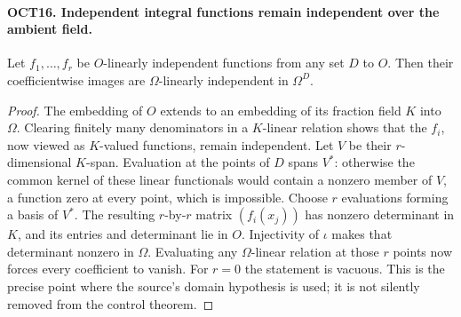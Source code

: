 \documentclass[11pt,a4paper]{article}
\numberwithin{equation}{section}
\theoremstyle{remark}\newtheorem{remark}[theorem]{Remark}
\begin{document}
\paragraph{OCT16. Independent integral functions remain independent over the ambient field.}
\label{claim:OCT16}
Let $f_1,\ldots,\allowbreak{} f_r$ be $O$-linearly independent functions
from any set $D$ to $O$.  Then their coefficientwise images
are $\Omega$-linearly independent in $\Omega^D$.
\begin{proof}
The embedding of $O$ extends to an embedding of its fraction
field $K$ into $\Omega$.  Clearing finitely many denominators
in a $K$-linear relation shows that the $f_i$, now viewed as
$K$-valued functions, remain independent.  Let $V$ be their
$r$-dimensional $K$-span.  Evaluation at the points of $D$
spans $V^*$: otherwise the common kernel of these linear
functionals would contain a nonzero member of $V$, a
function zero at every point, which is impossible.  Choose
$r$ evaluations forming a basis of $V^*$.  The resulting
$r$-by-$r$ matrix $(f_i(x_j))$ has nonzero determinant in
$K$, and its entries and determinant lie in $O$.
Injectivity of $\iota$ makes that determinant nonzero in
$\Omega$.  Evaluating any $\Omega$-linear relation at those
$r$ points now forces every coefficient to vanish.  For
$r=0$ the statement is vacuous.  This is the precise point
where the source's domain hypothesis is used; it is not
silently removed from the control theorem.
\end{proof}

\end{document}
